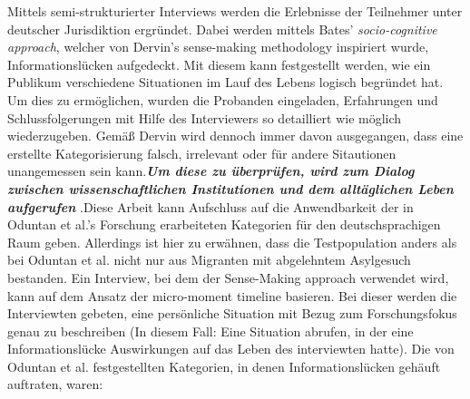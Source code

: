 Mittels semi-strukturierter Interviews werden die Erlebnisse der Teilnehmer unter deutscher Jurisdiktion ergr\"undet. Dabei werden mittels Bates' \textit{socio-cognitive approach}\cite{bates2005introduction}, welcher von Dervin's sense-making methodology\cite{dervin2003sense} inspiriert wurde, Informationsl\"ucken aufgedeckt.\newline
Mit diesem kann festgestellt werden, wie ein Publikum verschiedene Situationen im Lauf des Lebens logisch begr\"undet hat. Um dies zu erm\"oglichen, wurden die Probanden eingeladen, Erfahrungen und Schlussfolgerungen mit Hilfe des Interviewers so detailliert wie m\"oglich wiederzugeben.\newline
Gem\"a\ss{} Dervin wird dennoch immer davon ausgegangen, dass eine erstellte Kategorisierung falsch, irrelevant oder f\"ur andere Sitautionen unangemessen sein kann.\textit{\textbf{Um diese zu \"uberpr\"ufen, wird zum Dialog zwischen wissenschaftlichen Institutionen und dem allt\"aglichen Leben aufgerufen}} .Diese Arbeit kann Aufschluss auf die Anwendbarkeit der in Oduntan et al.'s Forschung erarbeiteten Kategorien f\"ur den deutschsprachigen Raum geben. Allerdings ist hier zu erwähnen, dass die Testpopulation anders als bei Oduntan et al. nicht nur aus Migranten mit abgelehntem Asylgesuch bestanden.\newline
Ein Interview, bei dem der Sense-Making approach verwendet wird, kann auf dem Ansatz der micro-moment timeline basieren. Bei dieser werden die Interviewten gebeten, eine pers\"onliche Situation mit Bezug zum Forschungsfokus genau zu beschreiben (In diesem Fall: Eine Situation abrufen, in der eine Informationsl\"ucke Auswirkungen auf das Leben des interviewten hatte).
Die von Oduntan et al. festgestellten Kategorien, in denen Informationsl\"ucken geh\"auft auftraten, waren:
